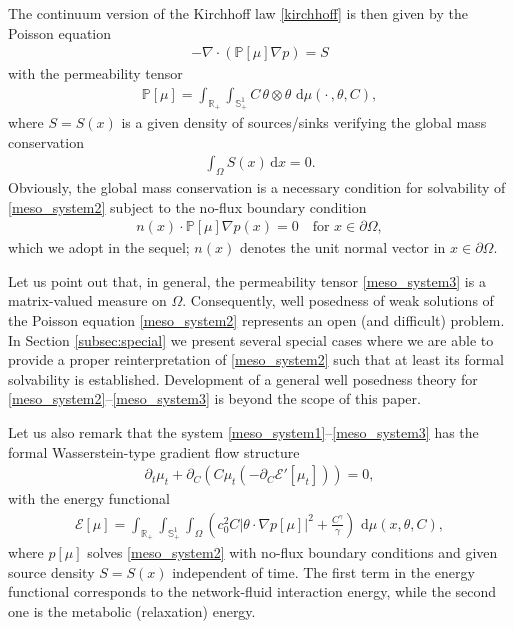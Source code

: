 \documentclass{article}
\numberwithin{equation}{section}
\def\d{\,\mathrm{d}}
\begin{document}
The continuum version of the Kirchhoff law \eqref{kirchhoff} is then given by the Poisson equation
\begin{align}\label{meso_system2}
   -\nabla \cdot (\mathbb{P}[\mu]\nabla p)=S
\end{align}
with the permeability tensor   
\begin{align}\label{meso_system3}
   \mathbb{P}[\mu] = \int_\mathbb{R_+}\int_{\mathbb{S}_+^1} C \, \theta \otimes \theta \, \d\mu(\cdot \, , \theta, C),
\end{align}
where $S=S(x)$ is a given density of sources/sinks verifying the global mass conservation
\begin{align*}
   \int_\Omega S(x) \d x = 0.
\end{align*}
Obviously, the global mass conservation is a necessary condition for solvability of \eqref{meso_system2}
subject to the no-flux boundary condition
\begin{align*}
   n(x) \cdot \mathbb{P}[\mu]\nabla p(x) = 0\quad\mbox{for } x\in\partial\Omega,
\end{align*}
which we adopt in the sequel; $n(x)$ denotes the unit normal vector in $x\in\partial\Omega$.

Let us point out that, in general, the permeability tensor \eqref{meso_system3} is a matrix-valued measure on $\Omega$.
Consequently, well posedness of weak solutions of the Poisson equation \eqref{meso_system2} represents an open (and difficult) problem.
In Section \ref{subsec:special} we present several special cases where we are able to provide a proper reinterpretation of \eqref{meso_system2}
such that at least its formal solvability is established. Development of a general well posedness theory for \eqref{meso_system2}--\eqref{meso_system3}
is beyond the scope of this paper.

Let us also remark that the system \eqref{meso_system1}--\eqref{meso_system3} has the formal Wasserstein-type gradient flow structure
\begin{align} \label{meso_system_gf}
   \partial_t \mu_t + \partial_C(C\mu_t(-\partial_C \mathcal{E}'[\mu_t]))=0,
\end{align}
with the energy functional
\begin{align} \label{Emu}
   \mathcal{E}[\mu] = \int_\mathbb{R_+}\int_{\mathbb{S}_+^1}\int_\Omega\left( c_0^2 C|\theta \cdot \nabla p[\mu]|^2 + \frac{C^\gamma}{\gamma} \right)\, \d \mu(x,\theta,C), 
\end{align}
where $p[\mu]$ solves \eqref{meso_system2} with no-flux boundary conditions and given source density $S=S(x)$ independent of time.
The first term in the energy functional corresponds to the network-fluid interaction energy,
while the second one is the metabolic (relaxation) energy.
\end{document}
